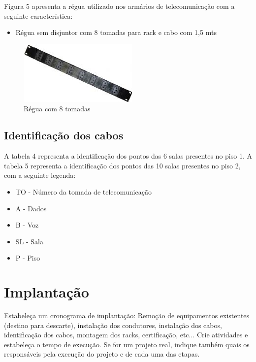 \documentclass[	DIV=calc,%
							paper=a4,%
							fontsize=12pt,%
							onecolumn]{scrartcl}	 					%
\begin{document}
Figura 5 apresenta a régua utilizado nos armários de telecomunicação com a seguinte característica: 
\begin{itemize}
\item Régua sem disjuntor com 8 tomadas para rack e cabo com 1,5 mts
\end{itemize}

\begin{figure}
	\centering
	\includegraphics[]{regua}
	\caption{Régua com 8 tomadas}
	\label{fig5}
\end{figure}


\subsection{Identificação dos cabos}
A tabela 4 representa a identificação dos pontos das 6 salas presentes no piso 1.
A tabela 5 representa a identificação dos pontos das 10 salas presentes no piso 2, com a seguinte legenda:
\begin{itemize}
\item TO - Número da tomada de telecomunicação
\item A  - Dados 
\item B  - Voz	
\item SL - Sala 
\item P  - Piso
\end{itemize}





\section{Implantação}
Estabeleça um cronograma de implantação:
Remoção de equipamentos existentes (destino para descarte), instalação dos condutores, instalação dos cabos, 
identificação dos cabos, montagem dos racks, certificação, etc... Crie atividades e estabeleça o tempo de execução. Se for um projeto real, indique também quais os responsáveis pela execução do projeto e de cada uma das etapas.
\end{document}
